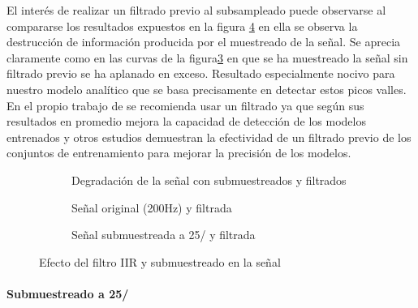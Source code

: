 \iffalse
\fi

El interés de realizar un filtrado previo al subsampleado puede observarse al compararse los resultados expuestos en la figura \ref{fig:iir} en ella se observa la destrucción de información producida por el muestreado de la señal. Se aprecia claramente como en las curvas de la figura\ref{fig:signalIIRFilter25} en que se ha muestreado la señal sin filtrado previo se ha aplanado en exceso. Resultado especialmente nocivo para nuestro modelo analítico que se basa precisamente en detectar estos picos valles. En el propio trabajo de  se recomienda usar un filtrado ya que según sus resultados en promedio mejora la capacidad de detección de los modelos entrenados y otros estudios \cite{Xiao2016,Tian2019,Liu2020} demuestran la efectividad de un filtrado previo de los conjuntos de entrenamiento para mejorar la precisión de los modelos.

\begin{figure}[htb!]
  \centering
  \begin{subfigure}[b]{0.96\textwidth}
      \centering
      \caption{\footnotesize Degradación de la señal con submuestreados y filtrados}
      \label{fig:downsample}
  \end{subfigure}
  \centering

  \begin{subfigure}[b]{0.48\textwidth}
      \centering
      \caption{\footnotesize Señal original (200Hz) y filtrada}
      \label{fig:signalIIRFilter}
  \end{subfigure}
  \hfill
  \begin{subfigure}[b]{0.48\textwidth}
      \centering
      \caption{\footnotesize Señal submuestreada a 25\hz/ y filtrada}
      \label{fig:signalIIRFilter25}
  \end{subfigure}
  \caption{\footnotesize \label{fig:iir}  Efecto del filtro IIR y submuestreado en la señal}
\end{figure}

\paragraph{Submuestreado a 25\hz/}

